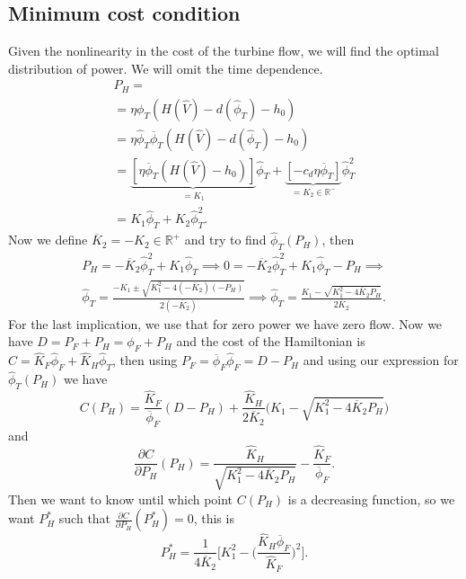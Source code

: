 \documentclass[12pt]{article}
\theoremstyle{definition}
\theoremstyle{remark}
\newcommand{\R}{\mathbb{R}}
\begin{document}
\subsection{Minimum cost condition}\label{MCC}

Given the nonlinearity in the cost of the turbine flow, we will find the optimal distribution of power. We will omit the time dependence.
\begin{multline}
P_H=\\
=\eta\phi_T(H(\hat{V})-d(\hat{\phi}_T)-h_0)\\
=\eta\hat{\phi}_T\overline{\phi}_T(H(\hat{V})-d(\hat{\phi}_T)-h_0)\\
=\underbrace{[\eta\overline{\phi}_T(H(\hat{V})-h_0)]}_{=K_1}\hat{\phi}_T+\underbrace{[-c_d\eta\overline{\phi}_T]}_{=K_2\in\R^-}\hat{\phi}_T^2\\
=K_1\hat{\phi}_T+K_2\hat{\phi}_T^2.
\label{Eq2}
\end{multline}
Now we define $\overline{K}_2=-K_2\in\R^+$ and try to find $\hat{\phi}_T(P_H)$, then
\begin{multline}
P_H=-\overline{K}_2\hat{\phi}_T^2+K_1\hat{\phi}_T\implies0=-\overline{K}_2\hat{\phi}_T^2+K_1\hat{\phi}_T-P_H\implies\\
\hat{\phi}_T=\frac{-K_1\pm\sqrt{K_1^2-4(-\overline{K}_2)(-P_H)}}{2(-\overline{K}_2)}\implies
\hat{\phi}_T=\frac{K_1-\sqrt{K_1^2-4\overline{K}_2P_H}}{2\overline{K}_2}.
\label{Eq3}
\end{multline}
For the last implication, we use that for zero power we have zero flow. Now we have $D=P_F+P_H=\phi_F+P_H$ and the cost of the Hamiltonian is $C=\hat{K}_F\hat{\phi}_F+\hat{K}_H\hat{\phi}_T$, then using $P_F=\overline{\phi}_F\hat{\phi}_F=D-P_H$ and using our expression for $\hat{\phi}_T(P_H)$ we have
\begin{equation*}
C(P_H)=\frac{\hat{K}_F}{\overline{\phi}_F}(D-P_H)+\frac{\hat{K}_H}{2\overline{K}_2}\Bigg(K_1-\sqrt{K_1^2-4\overline{K}_2P_H}\Bigg)
\end{equation*}
and
\begin{equation*}
\frac{\partial C}{\partial P_H}(P_H)=\frac{\hat{K}_H}{\sqrt{K_1^2-4\overline{K}_2P_H}}-\frac{\hat{K}_F}{\overline{\phi}_F}.
\end{equation*}
Then we want to know until which point $C(P_H)$ is a decreasing function, so we want $P_H^*$ such that $\frac{\partial C}{\partial P_H}(P_H^*)=0$, this is
\begin{equation*}
P_H^*=\frac{1}{4\overline{K}_2}\Bigg[K_1^2-\Bigg(\frac{\hat{K}_H\overline{\phi}_F}{\hat{K}_F}\Bigg)^2\Bigg].
\end{equation*}
\end{document}
